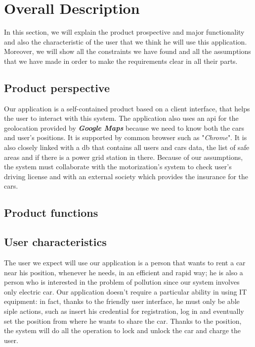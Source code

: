 \section{Overall Description} \label{sec:description}
In this section, we will explain the product prospective and major functionality and also the characteristic of the user that we think he will use this application. Moreover, we will show all the constraints we have found and all the assumptions that we have made in order to make the requirements clear in all their parts. 

\subsection{Product perspective} \label{subsec:prod_persp}
Our application is a self-contained product based on a client interface, that helps the user to interact with this system. The application also uses an \acs{api} for the geolocation provided by \emph{\textbf{Google Maps}} because we need to know both the cars and user's positions. It is supported by common browser such as "\emph{Chrome}". It is also closely linked with a \acs{db} that contains all users and cars data, the list of safe areas and if there is a power grid station in there. Because of our assumptions, the system must collaborate with the motorization's system to check user's driving license and with an external society which provides the  insurance for the cars.



\subsection{Product functions} \label{subsec:prod_funct}


\subsection{User characteristics} \label{subsec:user_char}
The user we expect will use our application is a person that wants to rent a car near his position, whenever he needs, in an efficient and rapid way; he is also a person who is interested in the problem of pollution since our system involves only electric car. Our application doesn't require a particular ability in using IT equipment: in fact, thanks to the friendly user interface, he must only be able siple actions, such as insert his credential for registration, log in and eventually set the position from where he wants to share the car. Thanks to the position, the system will do all the operation to lock and unlock the car and charge the user.

